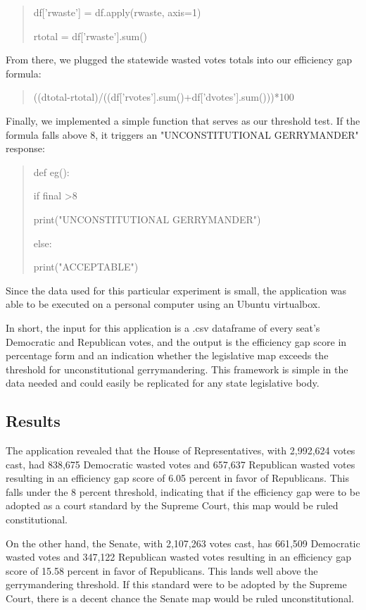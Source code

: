 \documentclass[sigconf]{acmart}
\begin{document}
\begin{quote}
    df['rwaste'] = df.apply(rwaste, axis=1)
    
    rtotal = df['rwaste'].sum()
\end{quote}

From there, we plugged the statewide wasted votes totals into our efficiency gap formula:

\begin{quote}
((dtotal-rtotal)/((df['rvotes'].sum()+df['dvotes'].sum()))*100
\end{quote}

Finally, we implemented a simple function that serves as our threshold test. If the formula falls above 8, it triggers an "UNCONSTITUTIONAL GERRYMANDER" response:

\begin{quote}
    def eg():
    
        if final \textgreater 8
        
          print("UNCONSTITUTIONAL GERRYMANDER")
            
        else:
        
          print("ACCEPTABLE")
\end{quote}

Since the data used for this particular experiment is small, the application was able to be executed on a personal computer using an Ubuntu virtualbox. 

In short, the input for this application is a .csv dataframe of every seat's Democratic and Republican votes, and the output is the efficiency gap score in percentage form and an indication whether the legislative map exceeds the threshold for unconstitutional gerrymandering. This framework is simple in the data needed and could easily be replicated for any state legislative body.

\subsection{Results}

The application revealed that the House of Representatives, with 2,992,624 votes cast, had 838,675 Democratic wasted votes and 657,637 Republican wasted votes resulting in an efficiency gap score of 6.05 percent in favor of Republicans. This falls under the 8 percent threshold, indicating that if the efficiency gap were to be adopted as a court standard by the Supreme Court, this map would be ruled constitutional.

On the other hand, the Senate, with 2,107,263 votes cast, has 661,509 Democratic wasted votes and 347,122 Republican wasted votes resulting in an efficiency gap score of 15.58 percent in favor of Republicans. This lands well above the gerrymandering threshold. If this standard were to be adopted by the Supreme Court, there is a decent chance the Senate map would be ruled unconstitutional. 
\end{document}
